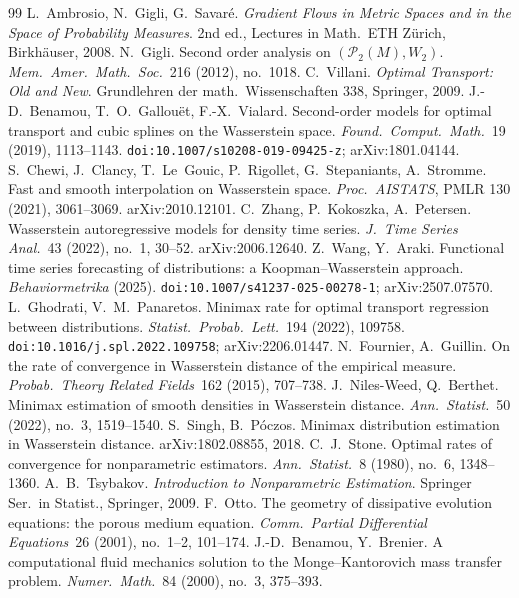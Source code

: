 \documentclass[11pt]{article}
\theoremstyle{definition}
\theoremstyle{remark}
\begin{document}
\begin{thebibliography}{99}
\small
{} L.~Ambrosio, N.~Gigli, G.~Savar\'e. \emph{Gradient Flows in Metric Spaces and in the Space of Probability Measures}. 2nd ed., Lectures in Math.\ ETH Z\"urich, Birkh\"auser, 2008.
 N.~Gigli. Second order analysis on $(\mathcal{P}_2(M),W_2)$. \emph{Mem.\ Amer.\ Math.\ Soc.}\ 216 (2012), no.~1018.
 C.~Villani. \emph{Optimal Transport: Old and New}. Grundlehren der math.\ Wissenschaften 338, Springer, 2009.
 J.-D.~Benamou, T.~O.~Gallou\"et, F.-X.~Vialard. Second-order models for optimal transport and cubic splines on the Wasserstein space. \emph{Found.\ Comput.\ Math.}\ 19 (2019), 1113--1143. \texttt{doi:10.1007/s10208-019-09425-z}; arXiv:1801.04144.
 S.~Chewi, J.~Clancy, T.~Le~Gouic, P.~Rigollet, G.~Stepaniants, A.~Stromme. Fast and smooth interpolation on Wasserstein space. \emph{Proc.\ AISTATS}, PMLR 130 (2021), 3061--3069. arXiv:2010.12101.
 C.~Zhang, P.~Kokoszka, A.~Petersen. Wasserstein autoregressive models for density time series. \emph{J.\ Time Series Anal.}\ 43 (2022), no.~1, 30--52. arXiv:2006.12640.
 Z.~Wang, Y.~Araki. Functional time series forecasting of distributions: a Koopman--Wasserstein approach. \emph{Behaviormetrika} (2025). \texttt{doi:10.1007/s41237-025-00278-1}; arXiv:2507.07570.
 L.~Ghodrati, V.~M.~Panaretos. Minimax rate for optimal transport regression between distributions. \emph{Statist.\ Probab.\ Lett.}\ 194 (2022), 109758. \texttt{doi:10.1016/j.spl.2022.109758}; arXiv:2206.01447.
 N.~Fournier, A.~Guillin. On the rate of convergence in Wasserstein distance of the empirical measure. \emph{Probab.\ Theory Related Fields}\ 162 (2015), 707--738.
 J.~Niles-Weed, Q.~Berthet. Minimax estimation of smooth densities in Wasserstein distance. \emph{Ann.\ Statist.}\ 50 (2022), no.~3, 1519--1540.
 S.~Singh, B.~P\'oczos. Minimax distribution estimation in Wasserstein distance. arXiv:1802.08855, 2018.
 C.~J.~Stone. Optimal rates of convergence for nonparametric estimators. \emph{Ann.\ Statist.}\ 8 (1980), no.~6, 1348--1360.
 A.~B.~Tsybakov. \emph{Introduction to Nonparametric Estimation}. Springer Ser.\ in Statist., Springer, 2009.
 F.~Otto. The geometry of dissipative evolution equations: the porous medium equation. \emph{Comm.\ Partial Differential Equations}\ 26 (2001), no.~1--2, 101--174.
 J.-D.~Benamou, Y.~Brenier. A computational fluid mechanics solution to the Monge--Kantorovich mass transfer problem. \emph{Numer.\ Math.}\ 84 (2000), no.~3, 375--393.

\end{thebibliography}
\end{document}
